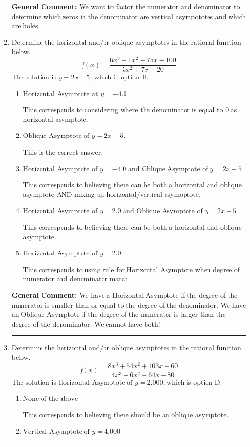 \documentclass{extbook}[14pt]
\newcommand{\litem}[1]{\item #1

\rule{\textwidth}{0.4pt}}
\begin{document}
\begin{enumerate}
{\textbf{General Comment:} We want to factor the numerator and denominator to determine which zeros in the denominator are vertical asympototes and which are holes.
}
\litem{
Determine the horizontal and/or oblique asymptotes in the rational function below.
\[ f(x) = \frac{6x^{3} -1 x^{2} -75 x + 100}{3x^{2} +7 x -20} \]The solution is \( y = 2x -5 \), which is option B.\begin{enumerate}[label=\Alph*.]
\item \( \text{Horizontal Asymptote at } y = -4.0 \)

This corresponds to considering where the denominator is equal to 0 as horizontal asymptote.
\item \( \text{Oblique Asymptote of } y = 2x -5. \)

This is the correct answer.
\item \( \text{Horizontal Asymptote of } y = -4.0 \text{ and Oblique Asymptote of } y = 2x -5 \)

This corresponds to believing there can be both a horizontal and oblique asymptote AND mixing up horizontal/vertical asymoptote.
\item \( \text{Horizontal Asymptote of } y = 2.0 \text{ and Oblique Asymptote of } y = 2x -5 \)

This corresponds to believing there can be both a horizontal and oblique asymptote.
\item \( \text{Horizontal Asymptote of } y = 2.0  \)

This corresponds to using rule for Horizontal Asymptote when degree of numerator and denominator match.
\end{enumerate}

\textbf{General Comment:} We have a Horizontal Asymptote if the degree of the numerator is smaller than or equal to the degree of the denominator. We have an Oblique Asymptote if the degree of the numerator is larger than the degree of the denominator. We cannot have both!
}
\litem{
Determine the horizontal and/or oblique asymptotes in the rational function below.
\[ f(x) = \frac{8x^{3} +54 x^{2} +103 x + 60}{4x^{3} -6 x^{2} -64 x -80} \]The solution is \( \text{Horizontal Asymptote of } y = 2.000  \), which is option D.\begin{enumerate}[label=\Alph*.]
\item \( \text{None of the above} \)

This corresponds to believing there should be an oblique asymptote.
\item \( \text{Vertical Asymptote of } y = 4.000  \)


\end{enumerate}}
\end{enumerate}
\end{document}

